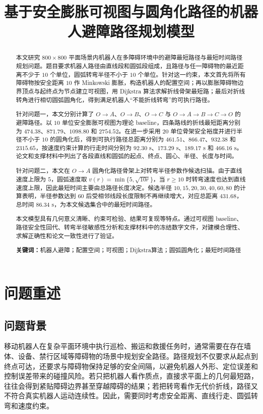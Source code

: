 \documentclass[UTF8,a4paper,12pt]{ctexart}
\title{基于安全膨胀可视图与圆角化路径的机器人避障路径规划模型}
\author{}
\date{}
\begin{document}
\maketitle
\thispagestyle{empty}

\begin{abstract}
本文研究 $800\times 800$ 平面场景内机器人在多障碍环境中的避障最短路径与最短时间路径规划问题。题目要求机器人路径由直线段和圆弧段组成，且路径与任一障碍物的最近距离不少于 $10$ 个单位，圆弧转弯半径不小于 $10$ 个单位。针对这一约束，本文首先将所有障碍物按安全距离 $10$ 作 Minkowski 膨胀，构造机器人的配置空间；再以膨胀障碍物边界顶点与起终点为节点建立可视图，用 Dijkstra 算法求解折线骨架最短路；最后对折线转角进行相切圆弧圆角化，得到满足机器人“不能折线转弯”的可执行路径。

针对问题一，本文分别计算了 $O\to A$、$O\to B$、$O\to C$ 与 $O\to A\to B\to C\to O$ 的避障路径。以 $10$ 单位安全膨胀可视图为理论 baseline，四条路线的折线最短距离分别为 $474.38$、$871.79$、$1098.80$ 和 $2754.52$。在进一步采用 $20$ 单位骨架安全裕度并进行半径不小于 $10$ 的圆角化后，得到可执行路径总距离分别为 $461.51$、$866.47$、$932.38$ 和 $2315.65$，按速度约束计算的行走时间分别为 $92.30$ s、$173.29$ s、$189.17$ s 和 $466.16$ s。论文和支撑材料中列出了各段直线和圆弧的起点、终点、圆心、半径、长度与时间。

针对问题二，本文在 $O\to A$ 圆角化路径骨架上对转弯半径参数作候选扫描。由于直线速度上限为 $5$，圆弧速度取 $v(r)=\min\{5,\sqrt{10r}\}$，当 $r\ge 10$ 时转弯速度也达到直线速度上限，因此最短时间主要由总路径长度决定。候选半径 $10,15,20,30,40,60,80$ 的计算表明，半径参数达到 $60$ 后受相邻线段长度限制不再继续增大，对应总距离 $431.68$，总时间 $86.34$ s，为本文候选集合中的最短时间路径。

本文模型具有几何意义清晰、约束可检验、结果可复现等特点。通过可视图 baseline、路径安全性回代、转弯半径敏感性分析和支撑材料中的冻结数字文件，对建模合理性、求解正确性和论文一致性进行了验证。

\textbf{关键词：}机器人避障；配置空间；可视图；Dijkstra算法；圆弧圆角化；最短时间路径
\end{abstract}

\newpage
\tableofcontents
\newpage

\section{问题重述}
\subsection{问题背景}
移动机器人在复杂平面环境中执行巡检、搬运和救援任务时，通常需要在存在墙体、设备、禁行区域等障碍物的场景中规划安全路径。路径规划不仅要求从起点到终点可达，还要求与障碍物保持足够的安全间隔，以避免机器人外形、定位误差和控制误差带来的碰撞风险。若只把机器人看作质点，直接求平面上的几何最短路，往往会得到紧贴障碍边界甚至穿越障碍的结果；若把转弯看作无代价折线，路径又不符合真实机器人运动连续性。因此，需要同时考虑安全距离、直线行走、圆弧转弯和速度约束。
\end{document}
